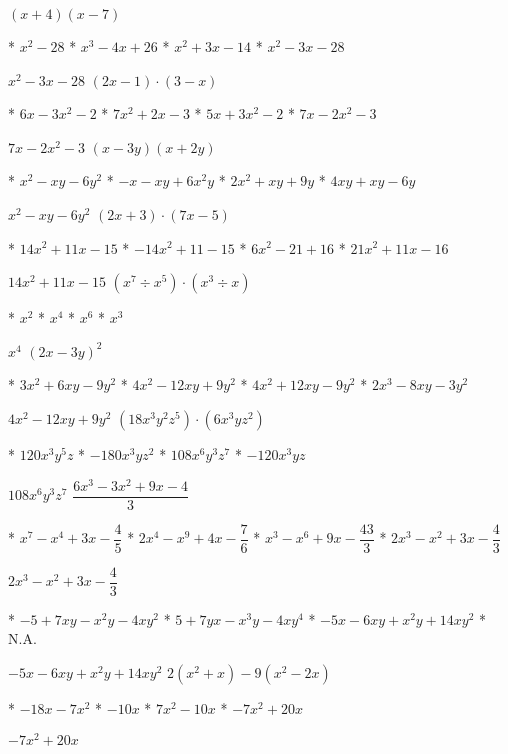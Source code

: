 $(x+4)(x-7)$
\begin{enum}
	* $x^2-28$
	* $x^3-4x+26$
	* $x^2+3x-14$
	* $x^2-3x-28$
\end{enum}
$x^2-3x-28$
$(2x-1)\cdot(3-x)$
\begin{enum}
	* $6x-3x^2-2$
	* $7x^2+2x-3$
	* $5x+3x^2-2$
	* $7x-2x^2-3$
\end{enum}
$7x-2x^2-3$
$(x-3y)(x+2y)$
\begin{enum}
	* $x^2-xy-6y^2$
	* $-x-xy+6x^2y$
	* $2x^2+xy+9y$
	* $4xy+xy-6y$
\end{enum}
$x^2-xy-6y^2$
$(2x+3)\cdot(7x-5)$
\begin{enum}
	* $14x^2+11x-15$
	* $-14x^2+11-15$
	* $6x^2-21+16$
	* $21x^2+11x-16$
\end{enum}
$14x^2+11x-15$
$\left(x^7\div x^5\right)\cdot\left(x^3\div x\right)$
\begin{enum}
	* $x^2$
	* $x^4$
	* $x^6$
	* $x^3$
\end{enum}
$x^4$
$(2x-3y)^2$
\begin{enum}
	* $3x^2+6xy-9y^2$
	* $4x^2-12xy+9y^2$
	* $4x^2+12xy-9y^2$
	* $2x^3-8xy-3y^2$
\end{enum}
$4x^2-12xy+9y^2$
$\left(18x^3y^2z^5\right)\cdot\left(6x^3yz^2\right)$
\begin{enum}
	* $120x^3y^5z$
	* $-180x^3yz^2$
	* $108x^6y^3z^7$
	* $-120x^3yz$
\end{enum}
$108x^6y^3z^7$
$\dfrac{6x^3-3x^2+9x-4}{3}$
\begin{enum}
	* $x^7-x^4+3x-\dfrac{4}{5}$
	* $2x^4-x^9+4x-\dfrac{7}{6}$
	* $x^3-x^6+9x-\dfrac{43}{3}$
	* $2x^3-x^2+3x-\dfrac{4}{3}$
\end{enum}
$2x^3-x^2+3x-\dfrac{4}{3}$
\begin{enum}
	* $-5+7xy-x^2y-4xy^2$
	* $5+7yx-x^3y-4xy^4$
	* $-5x-6xy+x^2y+14xy^2$
	* N.A.
\end{enum}
$-5x-6xy+x^2y+14xy^2$
$2\left(x^2+x\right)-9\left(x^2-2x\right)$
\begin{enum}
	* $-18x-7x^2$
	* $-10x$
	* $7x^2-10x$
	* $-7x^2+20x$
\end{enum}
$-7x^2+20x$
